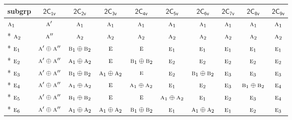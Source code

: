 \documentclass[10pt,a4paper]{article}
\numberwithin{equation}{section}
\newcommand{\grp}[1]{\mathsf{#1}}
\newcommand{\irr}[1]{\text{\normalfont\scshape #1}}
\begin{document}
{\small\begin{longtable}{@{}lccccccccc@{}}\toprule
subgrp & \href{2C1v.pdf}{$\grp{2C_{1v}}$} & \href{2C2v.pdf}{$\grp{2C_{2v}}$} & \href{2C3v.pdf}{$\grp{2C_{3v}}$} & \href{2C4v.pdf}{$\grp{2C_{4v}}$} & \href{2C5v.pdf}{$\grp{2C_{5v}}$} & \href{2C6v.pdf}{$\grp{2C_{6v}}$} & \href{2C7v.pdf}{$\grp{2C_{7v}}$} & \href{2C8v.pdf}{$\grp{2C_{8v}}$} & \href{2C9v.pdf}{$\grp{2C_{9v}}$}\\\midrule\endhead
\bottomrule\endfoot\endlastfoot
$\irr{a}_{1}$ & $\irr{a}'$ & $\irr{a}_{1}$ & $\irr{a}_{1}$ & $\irr{a}_{1}$ & $\irr{a}_{1}$ & $\irr{a}_{1}$ & $\irr{a}_{1}$ & $\irr{a}_{1}$ & $\irr{a}_{1}$\\*
$\irr{a}_{2}$ & $\irr{a}''$ & $\irr{a}_{2}$ & $\irr{a}_{2}$ & $\irr{a}_{2}$ & $\irr{a}_{2}$ & $\irr{a}_{2}$ & $\irr{a}_{2}$ & $\irr{a}_{2}$ & $\irr{a}_{2}$\\*
$\irr{e}_{1}$ & $\irr{a}'\oplus \irr{a}''$ & $\irr{b}_{1}\oplus \irr{b}_{2}$ & $\irr{e}$ & $\irr{e}$ & $\irr{e}_{1}$ & $\irr{e}_{1}$ & $\irr{e}_{1}$ & $\irr{e}_{1}$ & $\irr{e}_{1}$\\*
$\irr{e}_{2}$ & $\irr{a}'\oplus \irr{a}''$ & $\irr{a}_{1}\oplus \irr{a}_{2}$ & $\irr{e}$ & $\irr{b}_{1}\oplus \irr{b}_{2}$ & $\irr{e}_{2}$ & $\irr{e}_{2}$ & $\irr{e}_{2}$ & $\irr{e}_{2}$ & $\irr{e}_{2}$\\*
$\irr{e}_{3}$ & $\irr{a}'\oplus \irr{a}''$ & $\irr{b}_{1}\oplus \irr{b}_{2}$ & $\irr{a}_{1}\oplus \irr{a}_{2}$ & $\irr{e}$ & $\irr{e}_{2}$ & $\irr{b}_{1}\oplus \irr{b}_{2}$ & $\irr{e}_{3}$ & $\irr{e}_{3}$ & $\irr{e}_{3}$\\*
$\irr{e}_{4}$ & $\irr{a}'\oplus \irr{a}''$ & $\irr{a}_{1}\oplus \irr{a}_{2}$ & $\irr{e}$ & $\irr{a}_{1}\oplus \irr{a}_{2}$ & $\irr{e}_{1}$ & $\irr{e}_{2}$ & $\irr{e}_{3}$ & $\irr{b}_{1}\oplus \irr{b}_{2}$ & $\irr{e}_{4}$\\*
$\irr{e}_{5}$ & $\irr{a}'\oplus \irr{a}''$ & $\irr{b}_{1}\oplus \irr{b}_{2}$ & $\irr{e}$ & $\irr{e}$ & $\irr{a}_{1}\oplus \irr{a}_{2}$ & $\irr{e}_{1}$ & $\irr{e}_{2}$ & $\irr{e}_{3}$ & $\irr{e}_{4}$\\*
$\irr{e}_{6}$ & $\irr{a}'\oplus \irr{a}''$ & $\irr{a}_{1}\oplus \irr{a}_{2}$ & $\irr{a}_{1}\oplus \irr{a}_{2}$ & $\irr{b}_{1}\oplus \irr{b}_{2}$ & $\irr{e}_{1}$ & $\irr{a}_{1}\oplus \irr{a}_{2}$ & $\irr{e}_{1}$ & $\irr{e}_{2}$ & $\irr{e}_{3}$\\
\bottomrule\end{longtable}}
\end{document}
